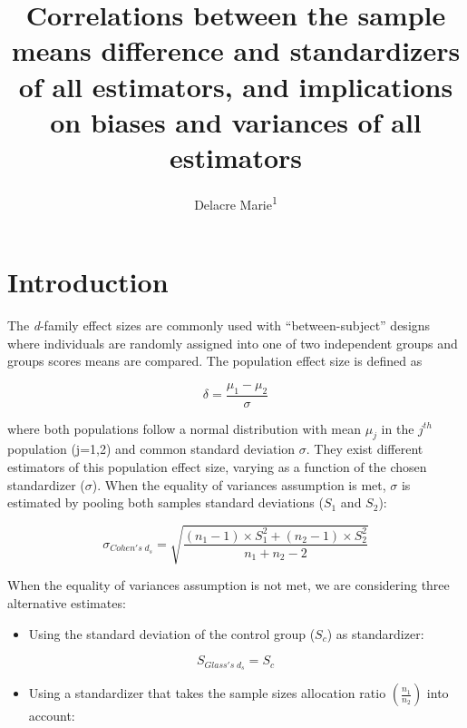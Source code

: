 \documentclass[
  man]{apa6}
\affiliation{
\vspace{0.5cm}
\textsuperscript{1} ULB}
\title{Correlations between the sample means difference and standardizers of all estimators, and implications on biases and variances of all estimators}
\author{Delacre Marie\textsuperscript{1}}
\date{}
\providecommand{\tightlist}{%
  \setlength{\itemsep}{0pt}\setlength{\parskip}{0pt}}
\begin{document}
\maketitle

\hypertarget{introduction}{%
\section{Introduction}\label{introduction}}

The \emph{d}-family effect sizes are commonly used with \enquote{between-subject} designs where individuals are randomly assigned into one of two independent groups and groups scores means are compared. The population effect size is defined as

\begin{equation} 
\delta = \frac{\mu_{1}-\mu_{2}}{\sigma} 
\label{eq:Cohendelta}
\end{equation}

where both populations follow a normal distribution with mean \(\mu_j\) in the \(j^{th}\) population (j=1,2) and common standard deviation \(\sigma\). They exist different estimators of this population effect size, varying as a function of the chosen standardizer (\(\sigma\)). When the equality of variances assumption is met, \(\sigma\) is estimated by pooling both samples standard deviations (\(S_1\) and \(S_2\)):

\begin{equation} 
\sigma_{Cohen's \; d_s} = \sqrt{\frac{(n_1-1) \times S_1^2+(n_2-1) \times S_2^2}{n_1+n_2-2}}
\label{eq:Cohends}
\end{equation}

When the equality of variances assumption is not met, we are considering three alternative estimates:

\begin{itemize}
\tightlist
\item
  Using the standard deviation of the control group (\(S_c\)) as standardizer:
\end{itemize}

\begin{equation} 
S_{Glass's \; d_s} = S_{c}
\label{eq:Glassds}
\end{equation}

\begin{itemize}
\tightlist
\item
  Using a standardizer that takes the sample sizes allocation ratio \(\left( \frac{n_1}{n_2}\right)\) into account:
\end{itemize}
\end{document}
